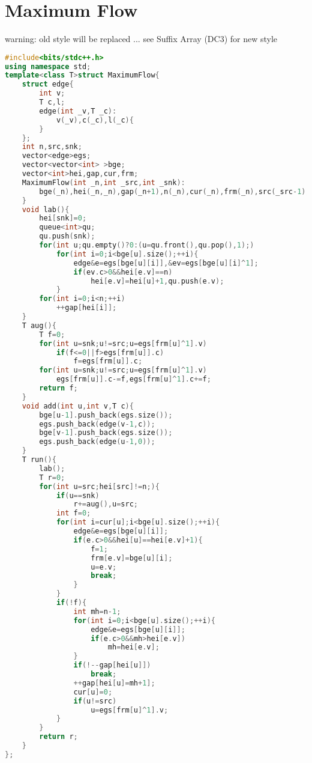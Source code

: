 \documentclass{book}
\begin{document}
\section{Maximum Flow}
warning: old style will be replaced ... see Suffix Array (DC3) for new style\begin{lstlisting}[language=C++,title={Maximum Flow.hpp (2311 bytes, 79 lines)}]
#include<bits/stdc++.h>
using namespace std;
template<class T>struct MaximumFlow{
    struct edge{
        int v;
        T c,l;
        edge(int _v,T _c):
            v(_v),c(_c),l(_c){
        }
    };
    int n,src,snk;
    vector<edge>egs;
    vector<vector<int> >bge;
    vector<int>hei,gap,cur,frm;
    MaximumFlow(int _n,int _src,int _snk):
        bge(_n),hei(_n,_n),gap(_n+1),n(_n),cur(_n),frm(_n),src(_src-1),snk(_snk-1){
    }
    void lab(){
        hei[snk]=0;
        queue<int>qu;
        qu.push(snk);
        for(int u;qu.empty()?0:(u=qu.front(),qu.pop(),1);)
            for(int i=0;i<bge[u].size();++i){
                edge&e=egs[bge[u][i]],&ev=egs[bge[u][i]^1];
                if(ev.c>0&&hei[e.v]==n)
                    hei[e.v]=hei[u]+1,qu.push(e.v);
            }
        for(int i=0;i<n;++i)
            ++gap[hei[i]];
    }
    T aug(){
        T f=0;
        for(int u=snk;u!=src;u=egs[frm[u]^1].v)
            if(f<=0||f>egs[frm[u]].c)
                f=egs[frm[u]].c;
        for(int u=snk;u!=src;u=egs[frm[u]^1].v)
            egs[frm[u]].c-=f,egs[frm[u]^1].c+=f;
        return f;
    }
    void add(int u,int v,T c){
        bge[u-1].push_back(egs.size());
        egs.push_back(edge(v-1,c));
        bge[v-1].push_back(egs.size());
        egs.push_back(edge(u-1,0));
    }
    T run(){
        lab();
        T r=0;
        for(int u=src;hei[src]!=n;){
            if(u==snk)
                r+=aug(),u=src;
            int f=0;
            for(int i=cur[u];i<bge[u].size();++i){
                edge&e=egs[bge[u][i]];
                if(e.c>0&&hei[u]==hei[e.v]+1){
                    f=1;
                    frm[e.v]=bge[u][i];
                    u=e.v;
                    break;
                }
            }
            if(!f){
                int mh=n-1;
                for(int i=0;i<bge[u].size();++i){
                    edge&e=egs[bge[u][i]];
                    if(e.c>0&&mh>hei[e.v])
                        mh=hei[e.v];
                }
                if(!--gap[hei[u]])
                    break;
                ++gap[hei[u]=mh+1];
                cur[u]=0;
                if(u!=src)
                    u=egs[frm[u]^1].v;
            }
        }
        return r;
    }
};
\end{lstlisting}
\end{document}
